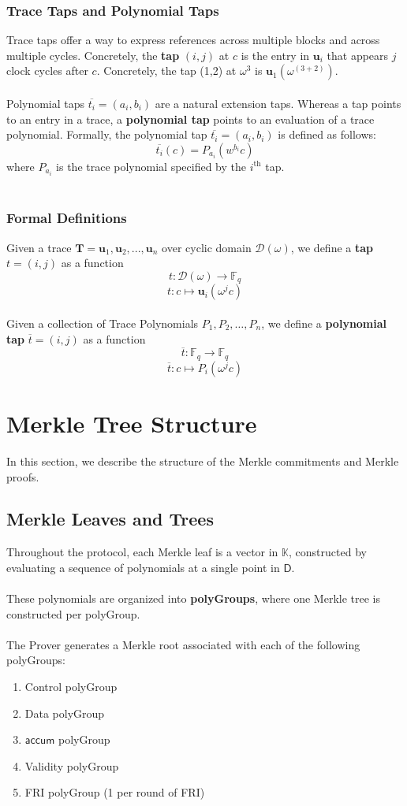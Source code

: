 \documentclass[10pt,letterpaper,titlepage]{article}
\newcommand{\GF}[1]{\mathbb{F}_{#1}}
\newcommand{\w}[0]{\omega}
\newcommand{\D}[0]{\mathcal{D}}
\theoremstyle{definition}
\begin{document}
\begin{appendices}
\subsubsection{Trace Taps and Polynomial Taps}
\label{taps}
Trace taps offer a way to express references across multiple blocks and across multiple cycles. 
Concretely, the \textbf{tap} $(i,j)$ at $c$ is the entry in $\mathbf{u}_i$ that appears $j$ clock cycles after $c$. 
Concretely, the tap (1,2) at $\w^3$ is $\mathbf{u}_1(\w^{(3+2)}).$\\
\\
Polynomial taps $\overline{t_i}=(a_i,b_i)$ are a natural extension taps. Whereas a tap points to an entry in a trace, a \textbf{polynomial tap} points to an evaluation of a trace polynomial. 
Formally, the polynomial tap $\overline{t_i}=(a_i,b_i)$ is defined as follows:
\[\overline{t_i}(c)=P_{a_i}(w^{b_i}c)\]where $P_{a_i}$ is the trace polynomial specified by the $i^\text{th}$ tap. \\
\\
\subsubsection*{Formal Definitions} 
Given a trace $\mathbf{T}=\mathbf{u}_1,\mathbf{u}_2,...,\mathbf{u}_n$ over cyclic domain $\D(\w)$, we define a \textbf{tap} $t=(i,j)$ as a function
\[t:\D(\w)\to\GF{q}\]
\[t:c\mapsto \mathbf{u}_i(\w^jc)\]
\\
Given a collection of Trace Polynomials $P_1,P_2,\ldots,P_n$, we define a \textbf{polynomial tap} $\overline{t}=(i,j)$ as a function
\[\overline{t}:\GF{q}\to\GF{q}\]
\[\overline{t}:c\mapsto P_i(\w^jc)\]



\section{Merkle Tree Structure}
\label{merkle}
In this section, we describe the structure of the Merkle commitments and Merkle proofs. 

\subsection*{Merkle Leaves and Trees} 
\label{polyGroup}
Throughout the protocol, each Merkle leaf is a vector in $\mathbb{K}$, constructed by evaluating a sequence of polynomials at a single point in $\mathsf{D}$. \\
\\
These polynomials are organized into \textbf{polyGroups}, where one Merkle tree is constructed per polyGroup. \\
\\
The Prover generates a Merkle root associated with each of the following polyGroups: 
\begin{enumerate}
  \item Control polyGroup 
  \item Data polyGroup 
  \item $\mathsf{accum}$ polyGroup 
  \item Validity polyGroup 
  \item FRI polyGroup (1 per round of FRI)
\end{enumerate}

\end{appendices}
\end{document}
